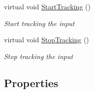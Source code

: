 \begin{DoxyCompactItemize}
virtual void \hyperlink{class_scaffolding_1_1_input_tracker_a354f0c69074700a14d7d969d9e6b18e4}{Start\-Tracking} ()
\begin{DoxyCompactList}\small\item\em Start tracking the input \end{DoxyCompactList}\item 
virtual void \hyperlink{class_scaffolding_1_1_input_tracker_a2381c906d5c7c84cb8fad33ad95c7386}{Stop\-Tracking} ()
\begin{DoxyCompactList}\small\item\em Stop tracking the input \end{DoxyCompactList}\end{DoxyCompactItemize}
\subsection*{Properties}
